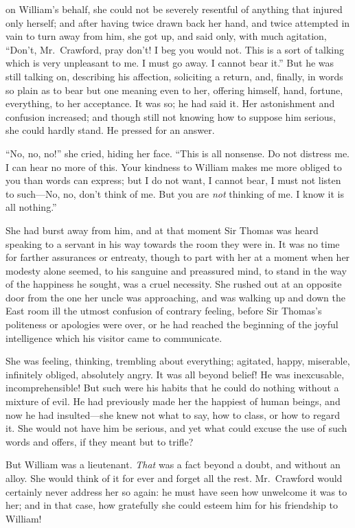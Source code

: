 \documentclass{article}
\begin{document}
on William's behalf, she could not be severely resentful
of anything that injured only herself; and after having
twice drawn back her hand, and twice attempted in vain
to turn away from him, she got up, and said only,
with much agitation, ``Don't, Mr.\ Crawford, pray don't! I
beg you would not.  This is a sort of talking which is very
unpleasant to me.  I must go away.  I cannot bear it.''
But he was still talking on, describing his affection,
soliciting a return, and, finally, in words so plain
as to bear but one meaning even to her, offering himself,
hand, fortune, everything, to her acceptance.  It was so;
he had said it.  Her astonishment and confusion increased;
and though still not knowing how to suppose him serious,
she could hardly stand.  He pressed for an answer.

``No, no, no!'' she cried, hiding her face.  ``This is all nonsense.
Do not distress me.  I can hear no more of this.
Your kindness to William makes me more obliged to you
than words can express; but I do not want, I cannot bear,
I must not listen to such---No, no, don't think of me.
But you are \emph{not} thinking of me.  I know it is all nothing.''

She had burst away from him, and at that moment Sir Thomas
was heard speaking to a servant in his way towards the room
they were in.  It was no time for farther assurances
or entreaty, though to part with her at a moment when her
modesty alone seemed, to his sanguine and preassured mind,
to stand in the way of the happiness he sought, was a
cruel necessity.  She rushed out at an opposite door
from the one her uncle was approaching, and was walking
up and down the East room ill the utmost confusion
of contrary feeling, before Sir Thomas's politeness
or apologies were over, or he had reached the beginning
of the joyful intelligence which his visitor came to communicate.

She was feeling, thinking, trembling about everything;
agitated, happy, miserable, infinitely obliged,
absolutely angry.  It was all beyond belief!
He was inexcusable, incomprehensible!  But such were
his habits that he could do nothing without a mixture
of evil.  He had previously made her the happiest
of human beings, and now he had insulted---she knew
not what to say, how to class, or how to regard it.
She would not have him be serious, and yet what could
excuse the use of such words and offers, if they meant but to
trifle?

But William was a lieutenant.  \emph{That} was a fact beyond
a doubt, and without an alloy.  She would think of it
for ever and forget all the rest.  Mr.\ Crawford would
certainly never address her so again:  he must have
seen how unwelcome it was to her; and in that case,
how gratefully she could esteem him for his friendship
to William!
\end{document}
